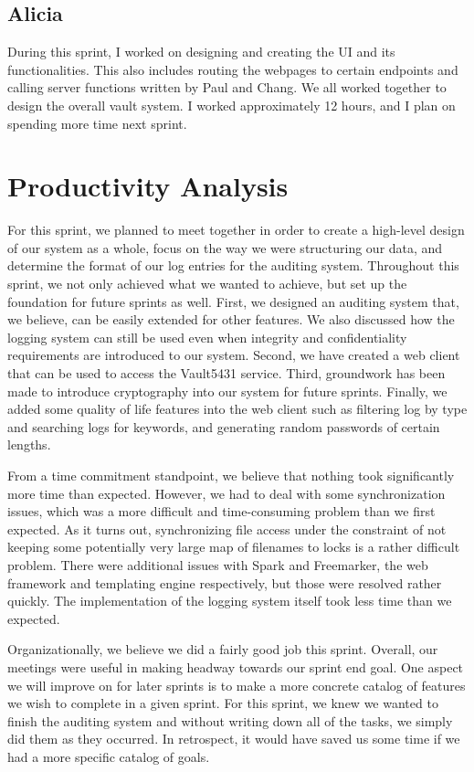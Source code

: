 \documentclass{article}
\begin{document}
\subsection{Alicia}
\par During this sprint, I worked on designing and creating the UI and its functionalities. This also includes routing the webpages to certain endpoints and calling server functions written by Paul and Chang. We all worked together to design the overall vault system. I worked approximately 12 hours, and I plan on spending more time next sprint.

\section{Productivity Analysis}
\par For this sprint, we planned to meet together in order to create a high-level design of our system as a whole, focus on the way we were structuring our data, and determine the format of our log entries for the auditing system. Throughout this sprint, we not only achieved what we wanted to achieve, but set up the foundation for future sprints as well. First, we designed an auditing system that, we believe, can be easily extended for other features. We also discussed how the logging system can still be used even when integrity and confidentiality requirements are introduced to our system. Second, we have created a web client that can be used to access the Vault5431 service. Third, groundwork has been made to introduce cryptography into our system for future sprints. Finally, we added some quality of life features into the web client such as filtering log by type and searching logs for keywords, and generating random passwords of certain lengths.\\

\par From a time commitment standpoint, we believe that nothing took significantly more time than expected. However, we had to deal with some synchronization issues, which was a more difficult and time-consuming problem than we first expected. As it turns out, synchronizing file access under the constraint of not keeping some potentially very large map of filenames to locks is a rather difficult problem. There were additional issues with Spark and Freemarker, the web framework and templating engine respectively, but those were resolved rather quickly. The implementation of the logging system itself took less time than we expected.\\

\par Organizationally, we believe we did a fairly good job this sprint. Overall, our meetings were useful in making headway towards our sprint end goal. One aspect we will improve on for later sprints is to make a more concrete catalog of features we wish to complete in a given sprint. For this sprint, we knew we wanted to finish the auditing system and without writing down all of the tasks, we simply did them as they occurred. In retrospect, it would have saved us some time if we had a more specific catalog of goals.
\end{document}
